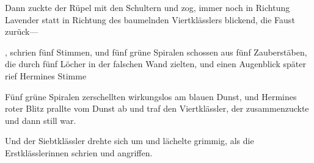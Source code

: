 Dann zuckte der Rüpel mit den Schultern und zog, immer noch in Richtung Lavender statt in Richtung des baumelnden Viertklässlers blickend, die Faust zurück—

, schrien fünf Stimmen, und fünf grüne Spiralen schossen aus fünf Zauberstäben, die durch fünf Löcher in der falschen Wand zielten, und einen Augenblick später rief Hermines Stimme 

Fünf grüne Spiralen zerschellten wirkungslos am blauen Dunst, und Hermines roter Blitz prallte vom Dunst ab und traf den Viertklässler, der zusammenzuckte und dann still war.

Und der Siebtklässler drehte sich um und lächelte grimmig, als die Erstklässlerinnen schrien und angriffen.

\later

